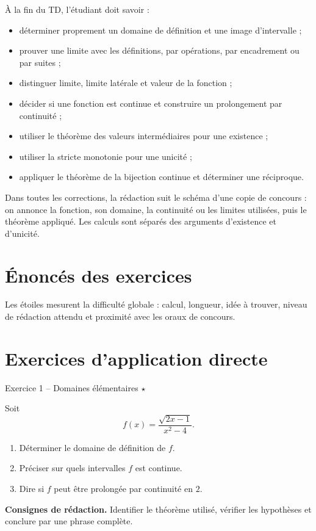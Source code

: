 \documentclass[11pt,a4paper]{article}
\newcommand{\etoiles}[1]{\hfill\textcolor{orangeprepa}{\textbf{#1}}}
\begin{document}
\begin{objectifbox}
À la fin du TD, l'étudiant doit savoir :
\begin{itemize}
\item déterminer proprement un domaine de définition et une image d'intervalle ;
\item prouver une limite avec les définitions, par opérations, par encadrement ou par suites ;
\item distinguer limite, limite latérale et valeur de la fonction ;
\item décider si une fonction est continue et construire un prolongement par continuité ;
\item utiliser le théorème des valeurs intermédiaires pour une existence ;
\item utiliser la stricte monotonie pour une unicité ;
\item appliquer le théorème de la bijection continue et déterminer une réciproque.
\end{itemize}
\end{objectifbox}

\begin{fichebox}
Dans toutes les corrections, la rédaction suit le schéma d'une copie de concours : on annonce la fonction, son domaine, la continuité ou les limites utilisées, puis le théorème appliqué. Les calculs sont séparés des arguments d'existence et d'unicité.
\end{fichebox}

\newpage

\section{Énoncés des exercices}
\begin{methodbox}
Les étoiles mesurent la difficulté globale : calcul, longueur, idée à trouver, niveau de rédaction attendu et proximité avec les oraux de concours.
\end{methodbox}
\section{Exercices d'application directe}
\begin{exobox}{Exercice 1 -- Domaines élémentaires \etoiles{$\star$}}

Soit
\[
f(x)=\frac{\sqrt{2x-1}}{x^2-4}.
\]
\begin{enumerate}
\item Déterminer le domaine de définition de $f$.
\item Préciser sur quels intervalles $f$ est continue.
\item Dire si $f$ peut être prolongée par continuité en $2$.
\end{enumerate}

\medskip
\textbf{Consignes de rédaction.} Identifier le théorème utilisé, vérifier les hypothèses et conclure par une phrase complète.
\end{exobox}
\end{document}
